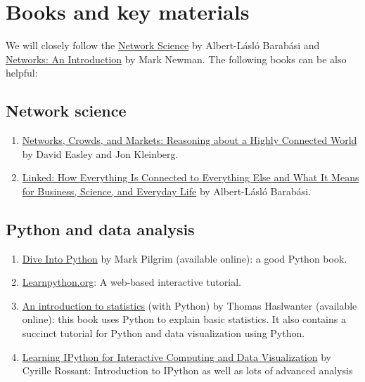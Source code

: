 \documentclass[11pt,article,oneside]{memoir} %
\begin{document}
\section{Books and key materials} %

We will closely follow the
\href{http://barabasi.com/networksciencebook/}{Network Science} by Albert-Lásló
Barabási and
\href{https://www.amazon.com/Networks-Mark-Newman/dp/0198805098}{Networks:
An Introduction} by Mark Newman. The following books can be also helpful:

\subsection{Network science} %

\begin{enumerate}
    \item \href{https://www.amazon.com/Networks-Crowds-Markets-Reasoning-Connected/dp/0521195330}{Networks, Crowds, and Markets: Reasoning about a Highly Connected World} by David Easley and Jon Kleinberg.
    \item \href{https://www.amazon.com/Linked-Everything-Connected-Business-Everyday/dp/0465085733}{Linked: How Everything Is Connected to Everything Else and What It Means for Business, Science, and Everyday Life} by Albert-Lásló Barabási.
\end{enumerate}

\subsection{Python and data analysis} %

\begin{enumerate}

\item \href{http://www.diveintopython3.net/index.html}{Dive Into Python} by Mark Pilgrim (available online): a good Python book.

\item \href{http://www.learnpython.org}{Learnpython.org}: A web-based interactive tutorial.

\item \href{http://work.thaslwanter.at/Stats/html/}{An introduction to statistics} (with Python) by Thomas Haslwanter (available online): this book uses Python to explain basic statistics. It also contains a succinct tutorial for Python and data visualization using Python.

\item \href{http://ipython.rossant.net}{Learning IPython for Interactive Computing and Data Visualization} by  Cyrille Rossant: Introduction to IPython as well as lots of advanced analysis


\end{enumerate} %
\end{document}
